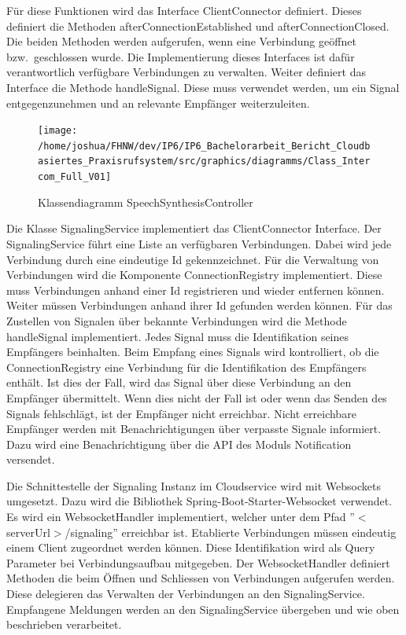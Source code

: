 Für diese Funktionen wird das Interface ClientConnector definiert.
Dieses definiert die Methoden afterConnectionEstablished und afterConnectionClosed.
Die beiden Methoden werden aufgerufen, wenn eine Verbindung geöffnet bzw.\ geschlossen wurde.
Die Implementierung dieses Interfaces ist dafür verantwortlich verfügbare Verbindungen zu verwalten.
Weiter definiert das Interface die Methode handleSignal.
Diese muss verwendet werden, um ein Signal entgegenzunehmen und an relevante Empfänger weiterzuleiten.

\begin{figure}[h]
    \centering
    \begin{minipage}[b]{1\textwidth}
        \texttt{[image: /home/joshua/FHNW/dev/IP6/IP6\_Bachelorarbeit\_Bericht\_Cloudbasiertes\_Praxisrufsystem/src/graphics/diagramms/Class\_Intercom\_Full\_V01]}
        \caption{Klassendiagramm SpeechSynthesisController}
    \end{minipage}
\end{figure}

Die Klasse SignalingService implementiert das ClientConnector Interface.
Der SignalingService führt eine Liste an verfügbaren Verbindungen.
Dabei wird jede Verbindung durch eine eindeutige Id gekennzeichnet.
Für die Verwaltung von Verbindungen wird die Komponente ConnectionRegistry implementiert.
Diese muss Verbindungen anhand einer Id registrieren und wieder entfernen können.
Weiter müssen Verbindungen anhand ihrer Id gefunden werden können.
Für das Zustellen von Signalen über bekannte Verbindungen wird die Methode handleSignal implementiert.
Jedes Signal muss die Identifikation seines Empfängers beinhalten.
Beim Empfang eines Signals wird kontrolliert, ob die ConnectionRegistry eine Verbindung für die Identifikation des Empfängers enthält.
Ist dies der Fall, wird das Signal über diese Verbindung an den Empfänger übermittelt.
Wenn dies nicht der Fall ist oder wenn das Senden des Signals fehlschlägt, ist der Empfänger nicht erreichbar.
Nicht erreichbare Empfänger werden mit Benachrichtigungen über verpasste Signale informiert.
Dazu wird eine Benachrichtigung über die API des Moduls Notification versendet.

Die Schnittestelle der Signaling Instanz im Cloudservice wird mit Websockets umgesetzt.
Dazu wird die Bibliothek Spring-Boot-Starter-Websocket verwendet.
Es wird ein WebsocketHandler implementiert, welcher unter dem Pfad ''$<$serverUrl$>$/signaling'' erreichbar ist.
Etablierte Verbindungen müssen eindeutig einem Client zugeordnet werden können.
Diese Identifikation wird als Query Parameter bei Verbindungsaufbau mitgegeben.
Der WebsocketHandler definiert Methoden die beim Öffnen und Schliessen von Verbindungen aufgerufen werden.
Diese delegieren das Verwalten der Verbindungen an den SignalingService.
Empfangene Meldungen werden an den SignalingService übergeben und wie oben beschrieben verarbeitet.


